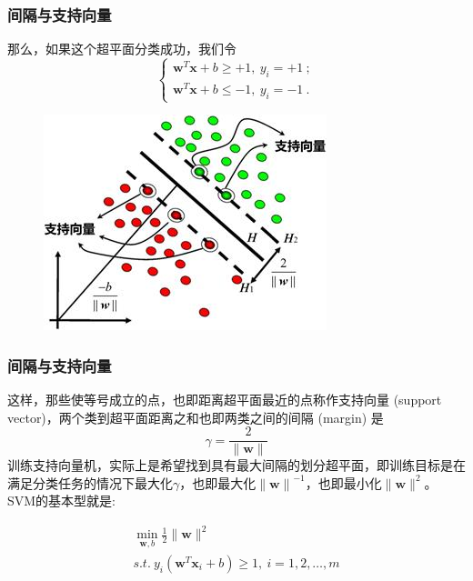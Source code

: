 \begin{frame}
\frametitle{间隔与支持向量}
那么，如果这个超平面分类成功，我们令
\[\begin{cases}
\boldsymbol{w}^T\boldsymbol{x}+b\geq+1,\ y_i=+1\ ;\\
\boldsymbol{w}^T\boldsymbol{x}+b\leq-1,\ y_i=-1\ .
\end{cases} \]

	\begin{figure}[ht]
	\centering
	\includegraphics[width=0.5\linewidth]{partition/img/svm_11.jpg}  
	\end{figure}
\end{frame}

\begin{frame}
\frametitle{间隔与支持向量}

这样，那些使等号成立的点，也即距离超平面最近的点称作支持向量 (support vector)，两个类到超平面距离之和也即两类之间的间隔 (margin) 是
\[
\gamma=\frac{2}{\|\boldsymbol{w}\|}
\]
训练支持向量机，实际上是希望找到具有最大间隔的划分超平面，即训练目标是在满足分类任务的情况下最大化$\gamma$，也即最大化$\|\boldsymbol{w\|}^{-1}$，也即最小化$\|\boldsymbol{w}\|^2$。
SVM的基本型就是:

\begin{gather*}
\min\limits_{\boldsymbol{w},b} \frac{1}{2}\|\boldsymbol{w}\|^2\\
s.t.\ y_i(\boldsymbol{w}^T\boldsymbol{x}_i+b)\geq1,\ i=1,2,…,m
\end{gather*}

\end{frame}